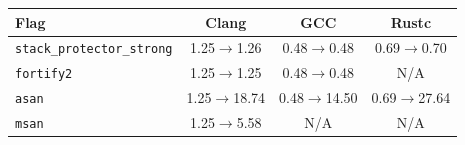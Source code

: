 \begin{tabular*}{\columnwidth}{@{\extracolsep\fill}lccc@{\extracolsep\fill}}
\toprule
\textbf{Flag} & \textbf{Clang} & \textbf{GCC} & \textbf{Rustc} \\
\midrule
\texttt{stack\_protector\_strong} & 1.25$\to$1.26 & 0.48$\to$0.48 & 0.69$\to$0.70 \\
\texttt{fortify2} & 1.25$\to$1.25 & 0.48$\to$0.48 & N/A \\
\texttt{asan} & 1.25$\to$18.74 & 0.48$\to$14.50 & 0.69$\to$27.64 \\
\texttt{msan} & 1.25$\to$5.58 & N/A & N/A \\
\bottomrule
\end{tabular*}

